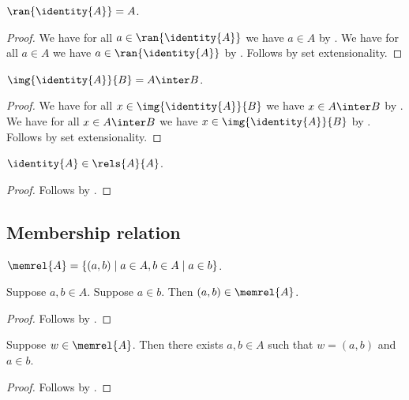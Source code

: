 \begin{proposition}\label{id_ran}
    $\ran{\identity{A}} = A$.
\end{proposition}
\begin{proof}
    We have for all $a\in\ran{\identity{A}}$ we have $a\in A$
        by .
    We have for all $a\in A$ we have $a\in\ran{\identity{A}}$
        by .
    Follows by set extensionality.
\end{proof}

\begin{proposition}\label{id_img}
    $\img{\identity{A}}{B} = A\inter B$.
\end{proposition}
\begin{proof}
    We have for all $x\in\img{\identity{A}}{B}$ we have $x\in A\inter B$
        by .
    We have for all $x\in A\inter B$ we have $x\in\img{\identity{A}}{B}$
        by .
    Follows by set extensionality.
\end{proof}

\begin{proposition}\label{id_elem_rels}
    $\identity{A}\in\rels{A}{A}$.
\end{proposition}
\begin{proof}
    Follows by
        .
\end{proof}

\subsection{Membership relation}

\begin{definition}\label{memrel}
    $\memrel{A} = \{(a, b)\mid a\in A, b\in A \mid a\in b\}$.
\end{definition}

\begin{proposition}\label{memrel_elem_intro}
    Suppose $a, b\in A$.
    Suppose $a\in b$.
    Then $(a, b) \in\memrel{A}$.
\end{proposition}
\begin{proof}
    Follows by .
\end{proof}

\begin{proposition}\label{memrel_elem_inspect}
    Suppose $w\in\memrel{A}$.
    Then there exists $a, b\in A$ such that $w = (a, b)$ and $a\in b$.
\end{proposition}
\begin{proof}
    Follows by .
\end{proof}

